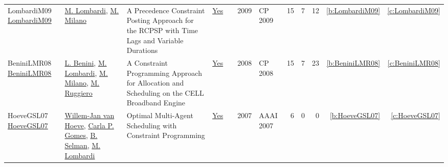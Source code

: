 {\begin{longtable}{>{\raggedright\arraybackslash}p{3cm}>{\raggedright\arraybackslash}p{6cm}>{\raggedright\arraybackslash}p{6.5cm}rrrp{2.5cm}rrrrr}
LombardiM09 \href{https://doi.org/10.1007/978-3-642-04244-7\_45}{LombardiM09} & \hyperref[auth:a143]{M. Lombardi}, \hyperref[auth:a144]{M. Milano} & A Precedence Constraint Posting Approach for the {RCPSP} with Time Lags and Variable Durations & \href{works/LombardiM09.pdf}{Yes} & \cite{LombardiM09} & 2009 & CP 2009 & 15 & 7 & 12 & \ref{b:LombardiM09} & \ref{c:LombardiM09}\\
BeniniLMR08 \href{http://dx.doi.org/10.1007/978-3-540-85958-1_2}{BeniniLMR08} & \hyperref[auth:a248]{L. Benini}, \hyperref[auth:a143]{M. Lombardi}, \hyperref[auth:a144]{M. Milano}, \hyperref[auth:a727]{M. Ruggiero} & A Constraint Programming Approach for Allocation and Scheduling on the CELL Broadband Engine & \href{works/BeniniLMR08.pdf}{Yes} & \cite{BeniniLMR08} & 2008 & CP 2008 & 15 & 7 & 23 & \ref{b:BeniniLMR08} & \ref{c:BeniniLMR08}\\
HoeveGSL07 \href{http://www.aaai.org/Library/AAAI/2007/aaai07-291.php}{HoeveGSL07} & \hyperref[auth:a212]{Willem{-}Jan van Hoeve}, \hyperref[auth:a652]{Carla P. Gomes}, \hyperref[auth:a653]{B. Selman}, \hyperref[auth:a143]{M. Lombardi} & Optimal Multi-Agent Scheduling with Constraint Programming & \href{works/HoeveGSL07.pdf}{Yes} & \cite{HoeveGSL07} & 2007 & AAAI 2007 & 6 & 0 & 0 & \ref{b:HoeveGSL07} & \ref{c:HoeveGSL07}\\
\end{longtable}
}

